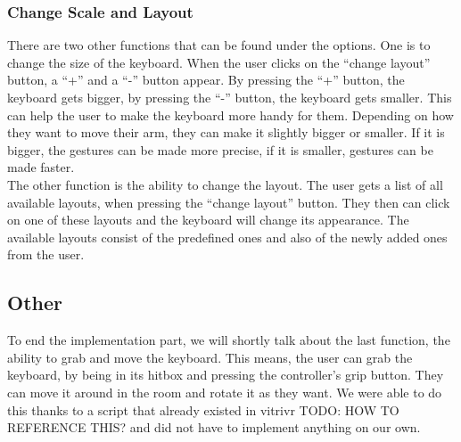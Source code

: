 \subsubsection{Change Scale and Layout}
There are two other functions that can be found under the options. One is to change the size of the keyboard. When the user clicks on the ``change layout'' button, a ``+'' and a ``-'' button appear. By pressing the ``+'' button, the keyboard gets bigger, by pressing the ``-'' button, the keyboard gets smaller. This can help the user to make the keyboard more handy for them. Depending on how they want to move their arm, they can make it slightly bigger or smaller. If it is bigger, the gestures can be made more precise, if it is smaller, gestures can be made faster.\\
The other function is the ability to change the layout. The user gets a list of all available layouts, when pressing the ``change layout'' button. They then can click on one of these layouts and the keyboard will change its appearance. The available layouts consist of the predefined ones and also of the newly added ones from the user.

\subsection{Other}
To end the implementation part, we will shortly talk about the last function, the ability to grab and move the keyboard. This means, the user can grab the keyboard, by being in its hitbox and pressing the controller's grip button. They can move it around in the room and rotate it as they want. We were able to do this thanks to a script that already existed in vitrivr TODO: HOW TO REFERENCE THIS? and did not have to implement anything on our own.